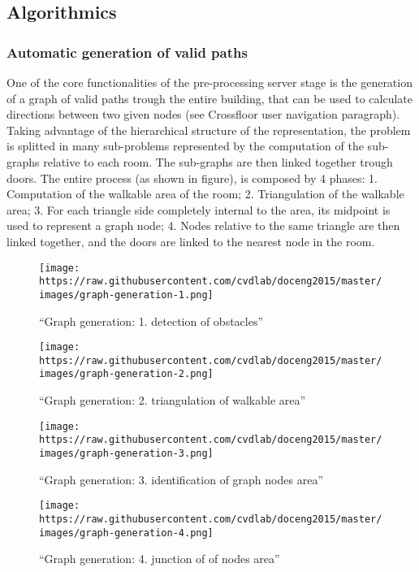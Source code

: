 \documentclass[]{article}
\begin{document}
\subsection{Algorithmics}\label{algorithmics}

\subsubsection{Automatic generation of valid
paths}\label{automatic-generation-of-valid-paths}

One of the core functionalities of the pre-processing server stage is
the generation of a graph of valid paths trough the entire building,
that can be used to calculate directions between two given nodes (see
Crossfloor user navigation paragraph). Taking advantage of the
hierarchical structure of the representation, the problem is splitted in
many sub-problems represented by the computation of the sub-graphs
relative to each room. The sub-graphs are then linked together trough
doors. The entire process (as shown in figure), is composed by 4 phases:
1. Computation of the walkable area of the room; 2. Triangulation of the
walkable area; 3. For each triangle side completely internal to the
area, its midpoint is used to represent a graph node; 4. Nodes relative
to the same triangle are then linked together, and the doors are linked
to the nearest node in the room.

\begin{figure}[htbp]
\centering
\texttt{[image: https://raw.githubusercontent.com/cvdlab/doceng2015/master/images/graph-generation-1.png]}
\caption{``Graph generation: 1. detection of obstacles''}
\end{figure}

\begin{figure}[htbp]
\centering
\texttt{[image: https://raw.githubusercontent.com/cvdlab/doceng2015/master/images/graph-generation-2.png]}
\caption{``Graph generation: 2. triangulation of walkable area''}
\end{figure}

\begin{figure}[htbp]
\centering
\texttt{[image: https://raw.githubusercontent.com/cvdlab/doceng2015/master/images/graph-generation-3.png]}
\caption{``Graph generation: 3. identification of graph nodes area''}
\end{figure}

\begin{figure}[htbp]
\centering
\texttt{[image: https://raw.githubusercontent.com/cvdlab/doceng2015/master/images/graph-generation-4.png]}
\caption{``Graph generation: 4. junction of of nodes area''}
\end{figure}
\end{document}
